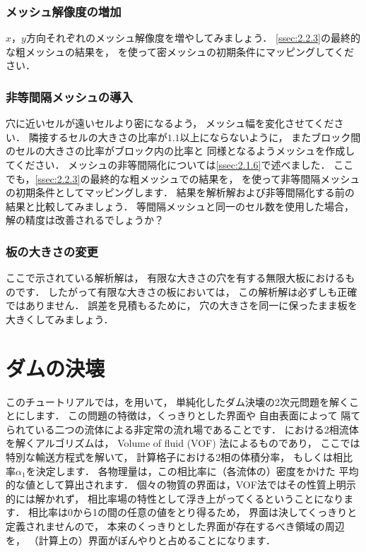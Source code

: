 \subsubsection{メッシュ解像度の増加}
\label{sssec:2.2.4.1}
$x$，$y$方向それぞれのメッシュ解像度を増やしてみましょう．
\autoref{ssec:2.2.3}の最終的な粗メッシュの結果を，
%
%
を使って密メッシュの初期条件にマッピングしてください．

\subsubsection{非等間隔メッシュの導入}
\label{sssec:2.2.4.2}
穴に近いセルが遠いセルより密になるよう，
メッシュ幅を変化させてください．
隣接するセルの大きさの比率が$1.1$以上にならないように，
またブロック間のセルの大きさの比率がブロック内の比率と
同様となるようメッシュを作成してください．
メッシュの非等間隔化については\autoref{ssec:2.1.6}で述べました．
ここでも，\autoref{ssec:2.2.3}の最終的な粗メッシュでの結果を，
を使って非等間隔メッシュの初期条件としてマッピングします．
結果を解析解および非等間隔化する前の結果と比較してみましょう．
等間隔メッシュと同一のセル数を使用した場合，
解の精度は改善されるでしょうか？

\subsubsection{板の大きさの変更}
\label{sssec:2.2.4.3}
ここで示されている解析解は，
有限な大きさの穴を有する無限大板におけるものです．
したがって有限な大きさの板においては，
この解析解は必ずしも正確ではありません．
誤差を見積もるために，
穴の大きさを同一に保ったまま板を大きくしてみましょう．



\section{ダムの決壊}
\label{sec:2.3}
%
%
このチュートリアルでは，を用いて，
単純化したダム決壊の2次元問題を解くことにします．
この問題の特徴は，くっきりとした界面や
%
自由表面によって
隔てられている二つの流体による非定常の流れ場であることです．
における2相流体を解くアルゴリズムは，
Volume of fluid (VOF) 法によるものであり，
ここでは特別な輸送方程式を解いて，
計算格子における2相の体積分率，
もしくは相比率$\alpha_{1}$を決定します．
各物理量は，この相比率に（各流体の）密度をかけた
平均的な値として算出されます．
個々の物質の界面は，VOF法ではその性質上明示的には解かれず，
相比率場の特性として浮き上がってくるということになります．
相比率は0から1の間の任意の値をとり得るため，
界面は決してくっきりと定義されませんので，
本来のくっきりとした界面が存在するべき領域の周辺を，
（計算上の）界面がぼんやりと占めることになります．

